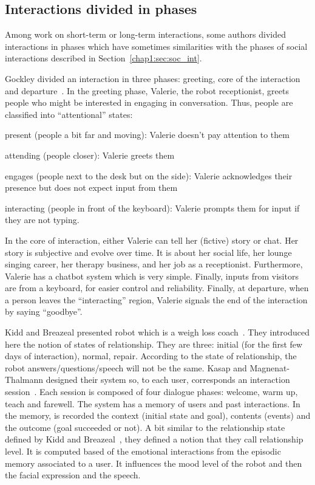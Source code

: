 \documentclass[a4paper,11pt,twoside]{StyleThese}
\begin{document}
\subsection{Interactions divided in phases}\label{chap2:subsec:inter_div}
Among work on short-term or long-term interactions, some authors divided interactions in phases which have sometimes similarities with the phases of social interactions described in Section~\ref{chap1:sec:soc_int}.

Gockley \etal{} divided an interaction in three phases: greeting, core of the interaction and departure~\cite{gockley_2005_designing}. In the greeting phase, Valerie, the robot receptionist, greets people who might be interested in engaging in conversation. Thus, people are classified into ``attentional'' states:
\begin{bulletList}
	\item present (people a bit far and moving): Valerie doesn’t pay attention to them
	\item attending (people closer): Valerie greets them
	\item engages (people next to the desk but on the side): Valerie acknowledges their presence but does not expect input from them
	\item interacting (people in front of the keyboard): Valerie prompts them for input if they are not typing.
\end{bulletList}
In the core of interaction, either Valerie can tell her (fictive) story or chat. Her story is subjective and evolve over time. It is about her social life, her lounge singing career, her therapy business, and her job as a receptionist. Furthermore, Valerie has a chatbot system which is very simple. Finally, inputs from visitors are from a keyboard, for easier control and reliability. Finally, at departure, when a person leaves the ``interacting'' region, Valerie signals the end of the interaction by saying ``goodbye''. 

Kidd and Breazeal presented robot which is a weigh loss coach~\cite{kidd_2008_robots}. They introduced here the notion of states of relationship. They are three: initial (for the first few days of interaction), normal, repair. According to the state of relationship, the robot answers/questions/speech will not be the same. Kasap and Magnenat-Thalmann designed their system so, to each user, corresponds an interaction session~\cite{kasap_2012_building}. Each session is composed of four dialogue phases: welcome, warm up, teach and farewell. The system has a memory of users and past interactions. In the memory, is recorded the context (initial state and goal), contents (events) and the outcome (goal succeeded or not). A bit similar to the relationship state defined by Kidd and Breazeal~\cite{kidd_2008_robots}, they defined a notion that they call relationship level. It is computed based of the emotional interactions from the episodic memory associated to a user. It influences the mood level of the robot and then the facial expression and the speech.
\end{document}
